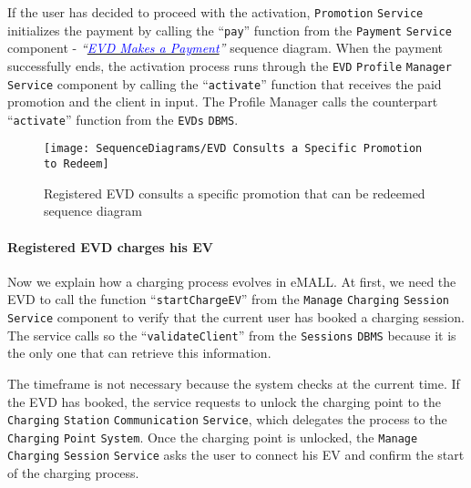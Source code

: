 If the user has decided to proceed with the activation, \verb|Promotion| \verb|Service| initializes the payment by calling the ``\verb|pay|'' function from the \verb|Payment| \verb|Service| component - \textit{``}\hyperlink{evdmakespayment}{\textcolor{blue}{\textit{EVD Makes a Payment}}}\textit{''} sequence diagram.
When the payment successfully ends, the activation process runs through the \verb|EVD| \verb|Profile| \verb|Manager| \verb|Service| component by calling the ``\verb|activate|'' function that receives the paid promotion and the client in input.
The Profile Manager calls the counterpart ``\verb|activate|'' function from the \verb|EVDs| \verb|DBMS|\@.
\begin{figure}[H]
    \begin{center}
        \texttt{[image: SequenceDiagrams/EVD Consults a Specific Promotion to Redeem]}
        \caption{Registered EVD consults a specific promotion that can be redeemed sequence diagram}
        \label{fig:evd_consults_specific_promotion_to_redeem}
    \end{center}
\end{figure}

\paragraph{Registered EVD charges his EV}
Now we explain how a charging process evolves in eMALL\@.
At first, we need the EVD to call the function ``\verb|startChargeEV|'' from the \verb|Manage| \verb|Charging| \verb|Session| \verb|Service| component to verify that the current user has booked a charging session.
The service calls so the ``\verb|validateClient|'' from the \verb|Sessions| \verb|DBMS| because it is the only one that can retrieve this information.

The timeframe is not necessary because the system checks at the current time.
If the EVD has booked, the service requests to unlock the charging point to the \verb|Charging| \verb|Station| \verb|Communication| \verb|Service|, which delegates the process to the \verb|Charging| \verb|Point| \verb|System|.
Once the charging point is unlocked, the \verb|Manage| \verb|Charging| \verb|Session| \verb|Service| asks the user to connect his EV and confirm the start of the charging process.


